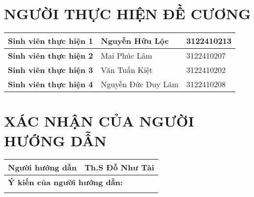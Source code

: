 \section*{NGƯỜI THỰC HIỆN ĐỀ CƯƠNG}

\begin{longtable}{|p{4.5cm}|p{6cm}|p{3cm}|}
    \hline
    \textbf{Sinh viên thực hiện 1} & Nguyễn Hữu Lộc & 3122410213 \\
    \hline
    \textbf{Sinh viên thực hiện 2} & Mai Phúc Lâm & 3122410207 \\
    \hline
    \textbf{Sinh viên thực hiện 3} & Văn Tuấn Kiệt & 3122410202 \\
    \hline
    \textbf{Sinh viên thực hiện 4} & Nguyễn Đức Duy Lâm & 3122410208 \\
    \hline
\end{longtable}

\section*{XÁC NHẬN CỦA NGƯỜI HƯỚNG DẪN}

\begin{longtable}{|p{4.5cm}|p{10cm}|}
    \hline
    \textbf{Người hướng dẫn} & Th.S Đỗ Như Tài \\
    \hline
    \multicolumn{2}{|l|}{\textbf{Ý kiến của người hướng dẫn:}} \\
    \multicolumn{2}{|p{14.5cm}|}{\vspace{3cm}} \\
    \hline
\end{longtable}